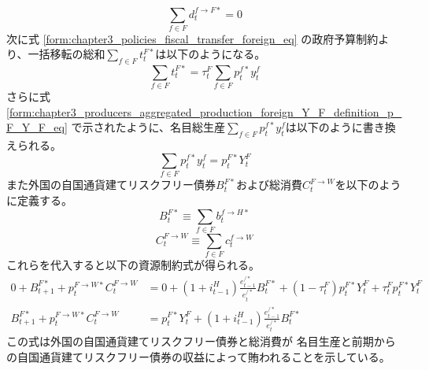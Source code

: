 \begin{equation}
\label{form:chapter3_resource_constraints_aggregate_foreign_equilibrium2_eq}
    \sum_{f\in F}d_t^{f\to F*}=0
\end{equation}
次に式
\eqref{form:chapter3_policies_fiscal_transfer_foreign_eq}
の政府予算制約より、一括移転の総和\(\sum_{f\in F}t_t^{F*}\)は以下のようになる。
\begin{equation}
\label{form:chapter3_resource_constraints_aggregate_foreign_fiscal_budget_eq}
    \sum_{f\in F}t_t^{F*}=\tau_t^F\sum_{f\in F}p_t^{f*}y_t^f
\end{equation}
さらに式
\eqref{form:chapter3_producers_aggregated_production_foreign_Y_F_definition_p_F_Y_F_eq}
で示されたように、名目総生産\(\sum_{f\in F}p_t^{f*}y_t^f\)は以下のように書き換えられる。
\begin{equation}
\label{form:chapter3_resource_constraints_aggregate_foreign_p_F_Y_F_eq}
    \sum_{f\in F}p_t^{f*}y_t^f=p_t^{F*}Y_t^F
\end{equation}
また外国の自国通貨建てリスクフリー債券\(B_t^{F*}\)および総消費\(C_t^{F\to W}\)を以下のように定義する。
\begin{equation}
\label{form:chapter3_resource_constraints_aggregate_foreign_B_F_def}
    B_t^{F*}\equiv\sum_{f\in F}b_t^{f\to H*}
\end{equation}
\begin{equation}
\label{form:chapter3_resource_constraints_aggregate_foreign_C_F_W_def}
    C_t^{F\to W}\equiv\sum_{f\in F}c_t^{f\to W}
\end{equation}
これらを代入すると以下の資源制約式が得られる。
\begin{align}
    \label{form:chapter3_resource_constraints_aggregate_foreign_sum_budgets_modified2_eq}
        0+B_{t+1}^{F*}+p_t^{F\to W*}C_t^{F\to W}
        &=0+(1+i_{t-1}^H)\frac{e_{t-1}^{/*}}{e_t^{/*}}B_t^{F*}+(1-\tau_t^F)p_t^{F*}Y_t^F+\tau_t^Fp_t^{F*}Y_t^F \\
    \label{form:chapter3_resource_constraints_aggregate_foreign_sum_budgets_modified3_eq}
        B_{t+1}^{F*}+p_t^{F\to W*}C_t^{F\to W}
        &=p_t^{F*}Y_t^F+(1+i_{t-1}^H)\frac{e_{t-1}^{/*}}{e_t^{/*}}B_t^{F*}
\end{align}
この式は外国の自国通貨建てリスクフリー債券と総消費が
名目生産と前期からの自国通貨建てリスクフリー債券の収益によって賄われることを示している。